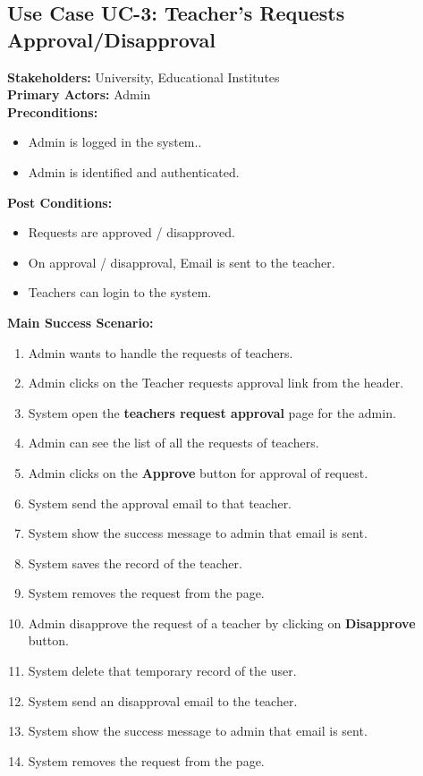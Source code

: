 \subsection{Use Case UC-3: Teacher's Requests Approval/Disapproval}
\textbf{Stakeholders: } University, Educational Institutes \\
\textbf{Primary Actors: } Admin \\
\textbf{Preconditions:}
\begin{itemize}
\item Admin is logged in the system..
\item Admin is identified and authenticated.
\end{itemize}
\textbf{Post Conditions: }
\begin{itemize}
\item Requests are approved / disapproved.
\item On approval / disapproval, Email is sent to the teacher.
\item Teachers can login to the system.
\end{itemize}
\textbf{Main Success Scenario:}
\begin{enumerate}
\item Admin wants to handle the requests of teachers.
\item Admin clicks on the Teacher requests approval link from the header.
\item System open the \textbf{teachers request approval} page for the admin.
\item Admin can see the list of all the requests of teachers.
\item Admin clicks on the \textbf{Approve} button for approval of request.
\item System send the approval email to that teacher.
\item System show the success message to admin that email is sent.
\item System saves the record of the teacher.
\item System removes the request from the page.
\item Admin disapprove the request of a teacher by clicking on \textbf{Disapprove} button.
\item System delete that temporary record of the user.
\item System send an disapproval email to the teacher.
\item System show the success message to admin that email is sent.
\item System removes the request from the page.
\end{enumerate}
